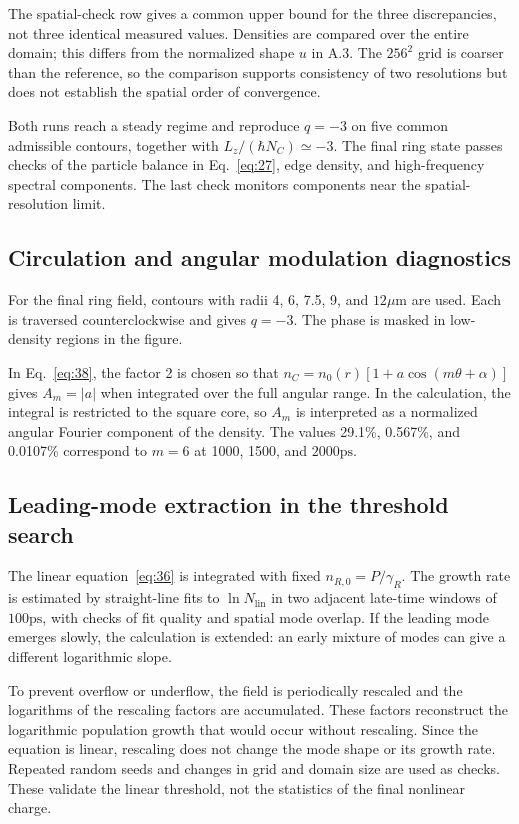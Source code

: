 \documentclass[12pt,a4paper]{article}
\begin{document}
The spatial-check row gives a common upper bound for the three discrepancies, not three identical measured values. Densities are compared over the entire domain; this differs from the normalized shape $u$ in A.3. The $256^2$ grid is coarser than the reference, so the comparison supports consistency of two resolutions but does not establish the spatial order of convergence.

Both runs reach a steady regime and reproduce $q=-3$ on five common admissible contours, together with $L_{z}/(\hbar N_{C})\simeq-3$. The final ring state passes checks of the particle balance in Eq.~\eqref{eq:27}, edge density, and high-frequency spectral components. The last check monitors components near the spatial-resolution limit.

\subsection{Circulation and angular modulation diagnostics}\label{sec:A.5}

For the final ring field, contours with radii 4, 6, 7.5, 9, and $12 \mu\mathrm m$ are used. Each is traversed counterclockwise and gives $q=-3$. The phase is masked in low-density regions in the figure.

In Eq.~\eqref{eq:38}, the factor 2 is chosen so that $n_{C}=n_{0}(r)[1+a \cos(m \theta+\alpha)]$ gives $A_{m}=|a|$ when integrated over the full angular range. In the calculation, the integral is restricted to the square core, so $A_{m}$ is interpreted as a normalized angular Fourier component of the density. The values 29.1\%, 0.567\%, and 0.0107\% correspond to $m=6$ at 1000, 1500, and $2000 \mathrm{ps}$.

\subsection{Leading-mode extraction in the threshold search}\label{sec:A.6}

The linear equation~\eqref{eq:36} is integrated with fixed $n_{R,0}=P/\gamma_{R}$. The growth rate is estimated by straight-line fits to $\ln N_{\mathrm{lin}}$ in two adjacent late-time windows of $100 \mathrm{ps}$, with checks of fit quality and spatial mode overlap. If the leading mode emerges slowly, the calculation is extended: an early mixture of modes can give a different logarithmic slope.

To prevent overflow or underflow, the field is periodically rescaled and the logarithms of the rescaling factors are accumulated. These factors reconstruct the logarithmic population growth that would occur without rescaling. Since the equation is linear, rescaling does not change the mode shape or its growth rate. Repeated random seeds and changes in grid and domain size are used as checks. These validate the linear threshold, not the statistics of the final nonlinear charge.
\end{document}
